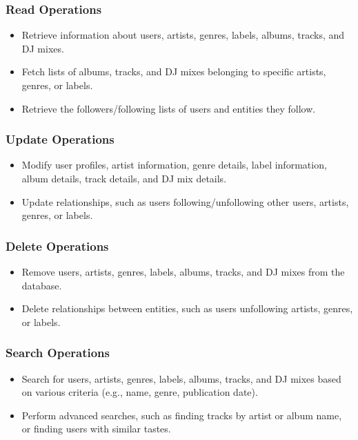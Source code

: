 \documentclass{article}
\begin{document}
\subsubsection{Read Operations}
\begin{itemize}
    \item Retrieve information about users, artists, genres, labels, albums, tracks, and DJ mixes.
    \item Fetch lists of albums, tracks, and DJ mixes belonging to specific artists, genres, or labels.
    \item Retrieve the followers/following lists of users and entities they follow.
\end{itemize}

\subsubsection{Update Operations}
\begin{itemize}
    \item Modify user profiles, artist information, genre details, label information, album details, track details, and DJ mix details.
    \item Update relationships, such as users following/unfollowing other users, artists, genres, or labels.
\end{itemize}

\subsubsection{Delete Operations}
\begin{itemize}
    \item Remove users, artists, genres, labels, albums, tracks, and DJ mixes from the database.
    \item Delete relationships between entities, such as users unfollowing artists, genres, or labels.
\end{itemize}

\subsubsection{Search Operations}
\begin{itemize}
    \item Search for users, artists, genres, labels, albums, tracks, and DJ mixes based on various criteria (e.g., name, genre, publication date).
    \item Perform advanced searches, such as finding tracks by artist or album name, or finding users with similar tastes.
\end{itemize}
\end{document}
